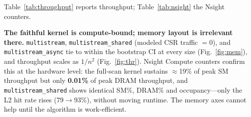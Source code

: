 \documentclass[conference]{IEEEtran}
\begin{document}
\begin{table}[t]
\centering
\caption{Throughput (Gbps) by technique and NFA size (batched, RTX 4070). Dashes:
$>64$ states unsupported by the single-word Triton/Warp kernels.}
\label{tab:throughput}
\small
\setlength{\tabcolsep}{4pt}
\end{table}

\begin{table}[t]
\centering
\caption{Nsight Compute counters (single launch). Full-scan: SM throughput $\gg$ DRAM
$\Rightarrow$ compute-bound; shared-CSR is identical but for L2 hit rate.}
\label{tab:nsight}
\small
\setlength{\tabcolsep}{4pt}
\end{table}

Table~\ref{tab:throughput} reports throughput; Table~\ref{tab:nsight} the Nsight counters.

\textbf{The faithful kernel is compute-bound; memory layout is irrelevant there.}
\texttt{multistream}, \texttt{multistream\_shared} (modeled CSR traffic $=0$), and
\texttt{multistream\_async} tie to within the bootstrap CI at every size
(Fig.~\ref{fig:mem}), and throughput scales as $1/n^2$ (Fig.~\ref{fig:thr}). Nsight Compute
counters confirm this at the hardware level: the full-scan kernel sustains $\approx$19\% of
peak SM throughput but only \textbf{0.01\%} of peak DRAM throughput, and
\texttt{multistream\_shared} shows identical SM\%, DRAM\% and occupancy---only the L2 hit
rate rises (79$\rightarrow$93\%), without moving runtime. The memory axes cannot help until
the algorithm is work-efficient.
\end{document}
